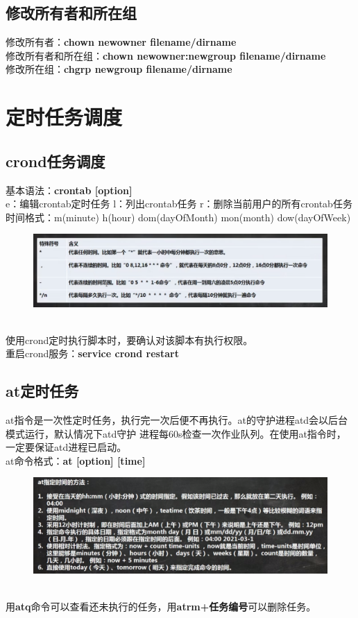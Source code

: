 \documentclass[11pt]{article}
\begin{document}
\subsection{修改所有者和所在组}
修改所有者：\textbf{chown newowner filename/dirname} \\
修改所有者和所在组：\textbf{chown newowner:newgroup filename/dirname}  \\
修改所在组：\textbf{chgrp newgroup filename/dirname}


\section{定时任务调度}

\subsection{crond任务调度}
基本语法：\textbf{crontab [option]}  \\
e：编辑crontab定时任务 \qquad l：列出crontab任务 \qquad r：删除当前用户的所有crontab任务 \\
时间格式：m(minute) h(hour) dom(dayOfMonth) mon(month) dow(dayOfWeek)  \\
\begin{figure}[htb]
    \centering
    \includegraphics[scale=0.3]{imgs/crontab.png}
\end{figure} \\
使用crond定时执行脚本时，要确认对该脚本有执行权限。  \\
重启crond服务：\textbf{service crond restart}

\subsection{at定时任务}
at指令是一次性定时任务，执行完一次后便不再执行。at的守护进程atd会以后台模式运行，默认情况下atd守护
进程每60s检查一次作业队列。在使用at指令时，一定要保证atd进程已启动。  \\
at命令格式：\textbf{at [option] [time]}  \\
\begin{figure}[htb]
    \centering
    \includegraphics[scale=0.27]{imgs/at_time.png}
\end{figure} \\
用\textbf{atq}命令可以查看还未执行的任务，用\textbf{atrm+任务编号}可以删除任务。
\end{document}
